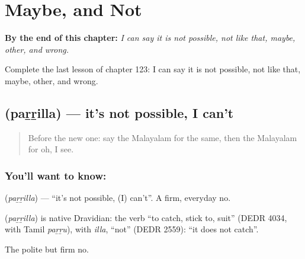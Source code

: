 
\chapter{Maybe, and Not}
\label{ch:ml-maybe-and-not}

\begin{chapteropening}
\textbf{By the end of this chapter:} \emph{I can say it is not possible, not like that, maybe, other, and wrong.}

Complete the last lesson of chapter 123: I can say it is not possible, not like that, maybe, other, and wrong.
\end{chapteropening}

\section[\texorpdfstring{\ml{പറ്റില്ല} (paṟṟilla)}{പറ്റില്ല (paṟṟilla)}]{ (paṟṟilla) — it's not possible, I can't}

\label{lesson:ML-C123-notpossible}



\begin{quote}
Before the new one: say the Malayalam for the same, then the Malayalam for oh, I see.
\end{quote}

\subsection*{You'll want to know: }
\textbf{} (\emph{paṟṟilla}) — \textquotedblleft{}it's not possible, (I) can't\textquotedblright{}. A firm, everyday no.

\begin{cousinweb}
\textbf{} (\emph{paṟṟilla}) is native Dravidian: the verb \textquotedblleft{}to catch, stick to, suit\textquotedblright{} (DEDR 4034, with Tamil \emph{paṟṟu}), with \emph{illa}, \textquotedblleft{}not\textquotedblright{} (DEDR 2559): \textquotedblleft{}it does not catch\textquotedblright{}.
\end{cousinweb}

\begin{grammarlens}[title={What you've built}]
The polite but firm no.
\end{grammarlens}

